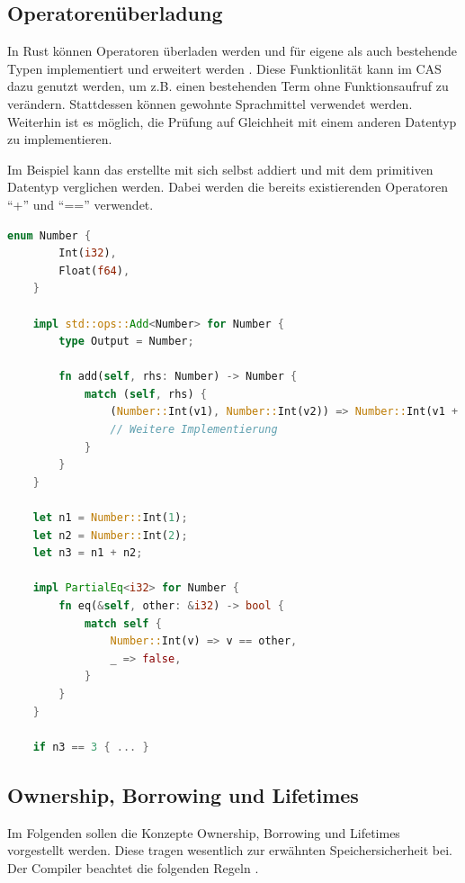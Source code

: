 \documentclass[11pt,a4paper, ngerman]{article}
\begin{document}
\subsection{Operatorenüberladung} In Rust können Operatoren überladen werden und für eigene als auch bestehende Typen implementiert und erweitert werden \cite{OperatorOverloading} \cite[S. 246 ff.]{BO18}. Diese Funktionlität kann im CAS dazu genutzt werden, um z.B. einen bestehenden Term ohne Funktionsaufruf zu verändern. Stattdessen können gewohnte Sprachmittel verwendet werden. Weiterhin ist es möglich, die Prüfung auf Gleichheit mit einem anderen Datentyp zu implementieren.

Im Beispiel kann das erstellte  mit sich selbst addiert und mit dem primitiven Datentyp  verglichen werden. Dabei werden die bereits existierenden Operatoren ``+'' und ``=='' verwendet.

\begin{lstlisting}[language=rust, caption={Operatorenüberladung}]
    enum Number {
        Int(i32),
        Float(f64),
    }

    impl std::ops::Add<Number> for Number {
        type Output = Number;

        fn add(self, rhs: Number) -> Number {
            match (self, rhs) {
                (Number::Int(v1), Number::Int(v2)) => Number::Int(v1 + v2),
                // Weitere Implementierung
            }
        }
    }

    let n1 = Number::Int(1);
    let n2 = Number::Int(2);
    let n3 = n1 + n2;

    impl PartialEq<i32> for Number {
        fn eq(&self, other: &i32) -> bool {
            match self {
                Number::Int(v) => v == other,
                _ => false,
            }
        }
    }

    if n3 == 3 { ... }
\end{lstlisting}

\subsection{Ownership, Borrowing und Lifetimes}
Im Folgenden sollen die Konzepte Ownership, Borrowing und Lifetimes vorgestellt werden. Diese tragen wesentlich zur erwähnten Speichersicherheit bei. Der Compiler beachtet die folgenden Regeln \cite{Rules1} \cite{Rules2}.
\end{document}
